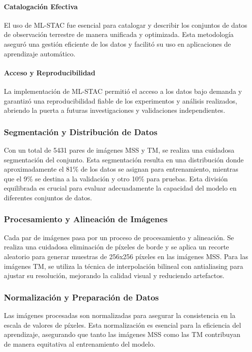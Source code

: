                 \paragraph{Catalogación Efectiva}
                    El uso de ML-STAC fue esencial para catalogar y describir los conjuntos de datos de observación terrestre de manera unificada y optimizada. Esta metodología aseguró una gestión eficiente de los datos y facilitó su uso en aplicaciones de aprendizaje automático.

                \paragraph{Acceso y Reproducibilidad}
                    La implementación de ML-STAC permitió el acceso a los datos bajo demanda y garantizó una reproducibilidad fiable de los experimentos y análisis realizados, abriendo la puerta a futuras investigaciones y validaciones independientes.

            \subsubsection{Segmentación y Distribución de Datos}
                Con un total de 5431 pares de imágenes MSS y TM, se realiza una cuidadosa segmentación del conjunto. Esta segmentación resulta en una distribución donde aproximadamente el 81\% de los datos se asignan para entrenamiento, mientras que el 9\% se destina a la validación y otro 10\% para pruebas. Esta división equilibrada es crucial para evaluar adecuadamente la capacidad del modelo en diferentes conjuntos de datos.
            
            \subsubsection{Procesamiento y Alineación de Imágenes} 
                Cada par de imágenes pasa por un proceso de procesamiento y alineación. Se realiza una cuidadosa eliminación de píxeles de borde y se aplica un recorte aleatorio para generar muestras de 256x256 píxeles en las imágenes MSS. Para las imágenes TM, se utiliza la técnica de interpolación bilineal con antialiasing para ajustar su resolución, mejorando la calidad visual y reduciendo artefactos.
            
            \subsubsection{Normalización y Preparación de Datos} 
                Las imágenes procesadas son normalizadas para asegurar la consistencia en la escala de valores de píxeles. Esta normalización es esencial para la eficiencia del aprendizaje, asegurando que tanto las imágenes MSS como las TM contribuyan de manera equitativa al entrenamiento del modelo. 
            
